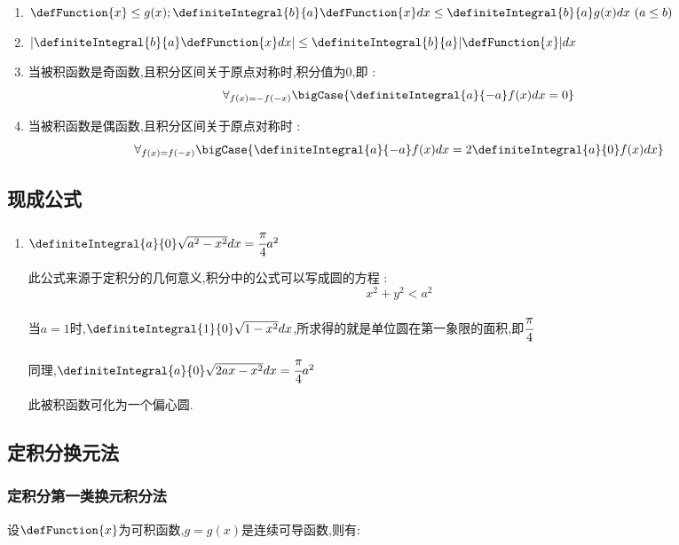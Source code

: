 {{{\begin{enumerate}
{          且$\definiteIntegral{b}{a}\defFunction{x}dx = \definiteIntegral{c}{a}\defFunction{x}dx - \definiteIntegral{c}{b}\defFunction{x}dx = \definiteIntegral{c}{a}\defFunction{x}dx + \definiteIntegral{b}{c}\defFunction{x}dx$
          }
    \item $\defFunction{x} \leq g(x); \definiteIntegral{b}{a}\defFunction{x}dx \leq \definiteIntegral{b}{a}g(x)dx\ (a \leq b)$
    \item $|\definiteIntegral{b}{a}\defFunction{x}dx|\leq\definiteIntegral{b}{a}|\defFunction{x}|dx$
    \item {
          当被积函数是奇函数,且积分区间关于原点对称时,积分值为0,即 : $$
            \forall_{f(x) = -f(-x)}\bigCase{\definiteIntegral{a}{-a}f(x)dx = 0}
          $$
          }
    \item {
          当被积函数是偶函数,且积分区间关于原点对称时 : $$
            \forall_{f(x) = f(-x)}\bigCase{\definiteIntegral{a}{-a}f(x)dx = 2\definiteIntegral{a}{0}f(x)dx}
          $$
          }
  \end{enumerate}
}%

\subsection{现成公式}{
  \begin{enumerate}
    \item {
          $\definiteIntegral{a}{0}\sqrt{a^2 - x^2}dx = \cfrac{\pi}{4}a^2$

          此公式来源于定积分的几何意义,积分中的公式可以写成圆的方程 : $$
            x^2 + y^2 < a^2
          $$

          当$a = 1$时,$\definiteIntegral{1}{0}\sqrt{1 -x^2}dx$,所求得的就是单位圆在第一象限的面积,即$\cfrac{\pi}{4}$

          同理,$\definiteIntegral{a}{0}\sqrt{2ax - x^2}dx = \cfrac{\pi}{4}a^2$

          此被积函数可化为一个偏心圆.
          }
  \end{enumerate}
}%

\subsection{定积分换元法}{
  \subsubsection{定积分第一类换元积分法}{
    设$\defFunction{x}$为可积函数,$g = g(x)$是连续可导函数,则有:

}}}}
